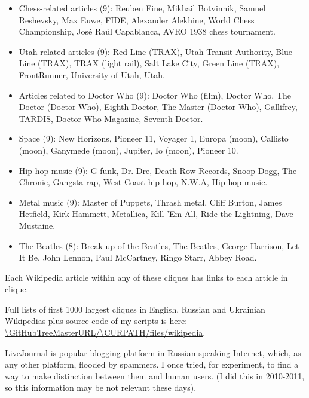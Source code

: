 \begin{itemize}

\item
Chess-related articles (9): Reuben Fine, Mikhail Botvinnik, Samuel Reshevsky, Max Euwe, FIDE, Alexander Alekhine, World Chess Championship, José Raúl Capablanca, AVRO 1938 chess tournament.

\item
Utah-related articles (9): Red Line (TRAX), Utah Transit Authority, Blue Line (TRAX), TRAX (light rail), Salt Lake City, Green Line (TRAX), FrontRunner, University of Utah, Utah.

\item
Articles related to Doctor Who (9): Doctor Who (film), Doctor Who, The Doctor (Doctor Who), Eighth Doctor, The Master (Doctor Who), Gallifrey, TARDIS, Doctor Who Magazine, Seventh Doctor.

\item
Space (9): New Horizons, Pioneer 11, Voyager 1, Europa (moon), Callisto (moon), Ganymede (moon), Jupiter, Io (moon), Pioneer 10.

\item
Hip hop music (9): G-funk, Dr. Dre, Death Row Records, Snoop Dogg, The Chronic, Gangsta rap, West Coast hip hop, N.W.A, Hip hop music.

\item
Metal music (9): Master of Puppets, Thrash metal, Cliff Burton, James Hetfield, Kirk Hammett, Metallica, Kill 'Em All, Ride the Lightning, Dave Mustaine.

\item
The Beatles (8): Break-up of the Beatles, The Beatles, George Harrison, Let It Be, John Lennon, Paul McCartney, Ringo Starr, Abbey Road.

\end{itemize}

Each Wikipedia article within any of these cliques has links to each article in clique.

Full lists of first 1000 largest cliques in English, Russian and Ukrainian Wikipedias plus source code of my scripts is here:
\url{\GitHubTreeMasterURL/\CURPATH/files/wikipedia}.


LiveJournal is popular blogging platform in Russian-speaking Internet, which, as any other platform, flooded by spammers.
I once tried, for experiment, to find a way to make distinction between them and human users.
(I did this in 2010-2011, so this information may be not relevant these days).

